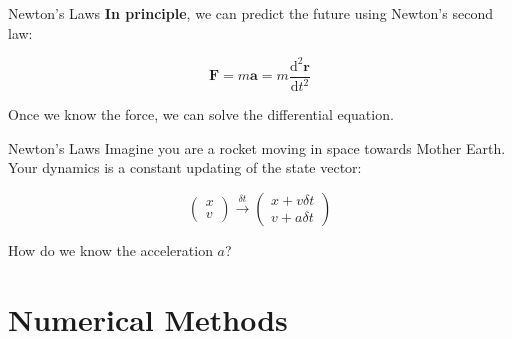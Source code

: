 \documentclass{beamer}
\begin{document}
\begin{frame}{Newton's Laws}
    \textbf{In principle}, we can predict the future using Newton's second law:

    \vspace{0.5cm}

    \begin{equation}
        \mathbf{F} = m \mathbf{a} = m \frac{\mathrm{d}^{2} \mathbf{r}}{\mathrm{d}t^{2}}
    \end{equation}

    \vspace{0.5cm}

    Once we know the force, we can solve the differential equation.
\end{frame}


\begin{frame}{Newton's Laws}
    Imagine you are a rocket moving in space towards Mother Earth. Your dynamics is a constant updating of the state vector:

    \vspace{0.5cm}

    \begin{equation}
        \begin{pmatrix}
            x \\
            v
        \end{pmatrix}
        \xrightarrow{\delta t}
        \begin{pmatrix}
            x + v \delta t \\
            v + a \delta t
        \end{pmatrix}
    \end{equation}

    \vspace{0.5cm}

    How do we know the acceleration $a$?
\end{frame}


\section{Numerical Methods}
\end{document}
